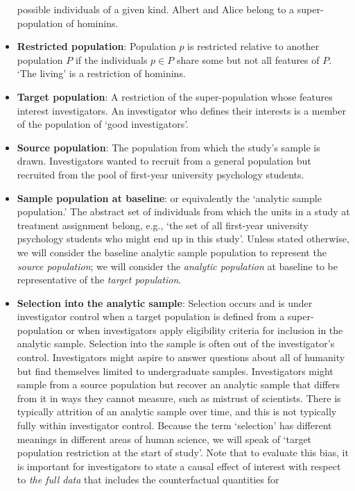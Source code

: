 \documentclass[
  single column]{article}
\begin{document}
\begin{itemize}
  possible individuals of a given kind. Albert and Alice belong to a
  super-population of hominins.
\item
  \textbf{Restricted population}: Population \(p\) is restricted
  relative to another population \(P\) if the individuals \(p \in P\)
  share some but not all features of \(P\). `The living' is a
  restriction of hominins.
\item
  \textbf{Target population}: A restriction of the super-population
  whose features interest investigators. An investigator who defines
  their interests is a member of the population of `good investigators'.
\item
  \textbf{Source population}: The population from which the study's
  sample is drawn. Investigators wanted to recruit from a general
  population but recruited from the pool of first-year university
  psychology students.
\item
  \textbf{Sample population at baseline}: or equivalently the `analytic
  sample population.' The abstract set of individuals from which the
  units in a study at treatment assignment belong, e.g., `the set of all
  first-year university psychology students who might end up in this
  study'. Unless stated otherwise, we will consider the baseline
  analytic sample population to represent the \emph{source population};
  we will consider the \emph{analytic population} at baseline to be
  representative of the \emph{target population}.
\item
  \textbf{Selection into the analytic sample}: Selection occurs and is
  under investigator control when a target population is defined from a
  super-population or when investigators apply eligibility criteria for
  inclusion in the analytic sample. Selection into the sample is often
  out of the investigator's control. Investigators might aspire to
  answer questions about all of humanity but find themselves limited to
  undergraduate samples. Investigators might sample from a source
  population but recover an analytic sample that differs from it in ways
  they cannot measure, such as mistrust of scientists. There is
  typically attrition of an analytic sample over time, and this is not
  typically fully within investigator control. Because the term
  `selection' has different meanings in different areas of human
  science, we will speak of `target population restriction at the start
  of study'. Note that to evaluate this bias, it is important for
  investigators to state a causal effect of interest with respect to
  \emph{the full data} that includes the counterfactual quantities for

\end{itemize}
\end{document}
